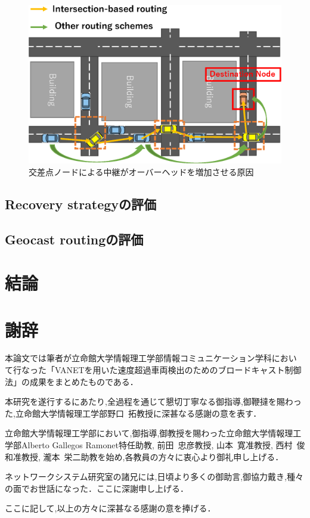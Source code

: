\documentclass[10pt]{jreport}
\begin{document}
\begin{figure}[!ht]
	\centering
	\includegraphics[width=130mm]{figures/intersection_routing.eps}
	\caption{交差点ノードによる中継がオーバーヘッドを増加させる原因}
	\label{fig:Intersection_route}
\end{figure}


\section{Recovery strategyの評価}
\label{Recovery_evaluation}
\section{Geocast routingの評価}
\label{Geocast_evaluation}


\chapter{結論}



\chapter*{謝辞}
\sloppy
本論文では筆者が立命館大学情報理工学部情報コミュニケーション学科におい
て行なった「VANETを用いた速度超過車両検出のためのブロードキャスト制御法」の成果をまとめたものである．

本研究を遂行するにあたり,全過程を通じて懇切丁寧なる御指導,御鞭撻を賜わっ
た,立命館大学情報理工学部野口~拓教授に深甚なる感謝の意を表す．

立命館大学情報理工学部において,御指導,御教授を賜わった立命館大学情報理工学部Alberto Gallegos Ramonet特任助教, 前田~忠彦教授, 山本~寛准教授, 西村~俊和准教授, 瀧本~栄二助教を始め,各教員の方々に衷心より御礼申し上げる．


ネットワークシステム研究室の諸兄には,日頃より多くの御助言,御協力戴き,種々の面でお世話になった．ここに深謝申し上げる．

ここに記して,以上の方々に深甚なる感謝の意を捧げる．





\end{document}
